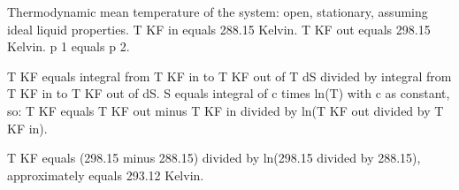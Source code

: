 Thermodynamic mean temperature of the system: open, stationary, assuming ideal liquid properties.  
T KF in equals 288.15 Kelvin.  
T KF out equals 298.15 Kelvin.  
p 1 equals p 2.  

T KF equals integral from T KF in to T KF out of T dS divided by integral from T KF in to T KF out of dS.  
S equals integral of c times ln(T) with c as constant, so:  
T KF equals T KF out minus T KF in divided by ln(T KF out divided by T KF in).  

T KF equals (298.15 minus 288.15) divided by ln(298.15 divided by 288.15), approximately equals 293.12 Kelvin.